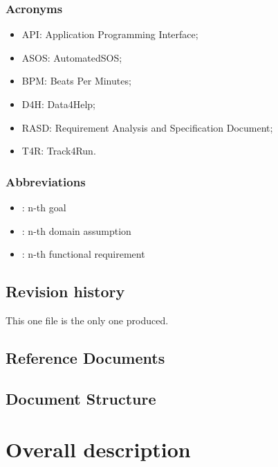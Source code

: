 \documentclass{article}
\begin{document}
\subsubsection{Acronyms}
\begin{itemize}
\item API: Application Programming Interface;
\item ASOS: AutomatedSOS;
\item BPM: Beats Per Minutes;
\item D4H: Data4Help;
\item RASD: Requirement Analysis and Specification Document;
\item T4R: Track4Run.
\end{itemize}

\subsubsection{Abbreviations}
\begin{itemize}
		\item \begin{math}[Gn]\end{math}: n-th goal
		\item \begin{math}[Dn]\end{math}: n-th domain assumption 
		\item \begin{math}[Rn]\end{math}: n-th functional requirement
\end{itemize}

\subsection{Revision history}
This one file is the only one produced.
\subsection{Reference Documents}
\subsection{Document Structure}
\newpage
\section{Overall description}
\end{document}
